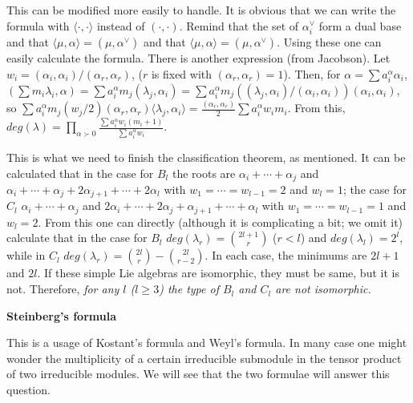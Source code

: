 \documentclass{article}
\begin{document}
This can be modified more easily to handle.
It is obvious that we can write the formula with $\langle \cdot, \cdot \rangle$ instead of $(\cdot, \cdot)$.
Remind that the set of $\alpha_i^\vee$ form a dual base and that $\langle \mu, \alpha \rangle = (\mu, \alpha^\vee)$ and that $\langle \mu, \alpha \rangle = (\mu, \alpha^\vee)$.
Using these one can easily calculate the formula.
There is another expression (from Jacobson).
Let $w_i = (\alpha_i, \alpha_i) / (\alpha_r, \alpha_r)$, ($r$ is fixed with $(\alpha_r, \alpha_r) = 1$).
Then, for $\alpha = \sum a_i^\alpha \alpha_i$, $(\sum m_i \lambda_i, \alpha) = \sum a_i^\alpha m_j (\lambda_j, \alpha_i) = \sum a_i^\alpha m_j ((\lambda_j, \alpha_i) / (\alpha_i, \alpha_i)) (\alpha_i, \alpha_i)$, so $\sum a_i^\alpha m_j (w_j/2) (\alpha_r, \alpha_r) \langle \lambda_j, \alpha_i \rangle = \frac{(\alpha_r, \alpha_r)}{2} \sum a_i^\alpha w_i m_i$.
From this, $deg(\lambda) = \prod_{\alpha \succ 0} \frac{\sum a_i^\alpha w_i (m_i + 1)}{\sum a_i^\alpha w_i}$.

This is what we need to finish the classification theorem, as mentioned.
It can be calculated that in the case for $B_l$ the roots are $\alpha_i + \cdots + \alpha_j$ and $\alpha_i + \cdots + \alpha_j + 2\alpha_{j + 1} + \cdots + 2\alpha_l$ with $w_1 = \cdots = w_{l - 1} = 2$ and $w_l = 1$; the case for $C_l$ $\alpha_i + \cdots + \alpha_j$ and $2\alpha_i + \cdots + 2\alpha_j + \alpha_{j + 1} + \cdots + \alpha_l$ with $w_1 = \cdots = w_{l - 1} = 1$ and $w_l = 2$.
From this one can directly (although it is complicating a bit; we omit it) calculate that in the case for $B_l$ $deg(\lambda_r) = \binom{2l + 1}{r}$ ($r < l$) and $deg(\lambda_l) = 2^l$, while in $C_l$ $deg(\lambda_r) = \binom{2l}{r} - \binom{2l}{r - 2}$.
In each case, the minimums are $2l + 1$ and $2l$.
If these simple Lie algebras are isomorphic, they must be same, but it is not.
Therefore, \textit{for any $l$ ($l \ge 3$) the type of $B_l$ and $C_l$ are not isomorphic.}

\newpage

\textbf{Steinberg's formula}

This is a usage of Kostant's formula and Weyl's formula.
In many case one might wonder the multiplicity of a certain irreducible submodule in the tensor product of two irreducible modules.
We will see that the two formulae will answer this question.
\end{document}
